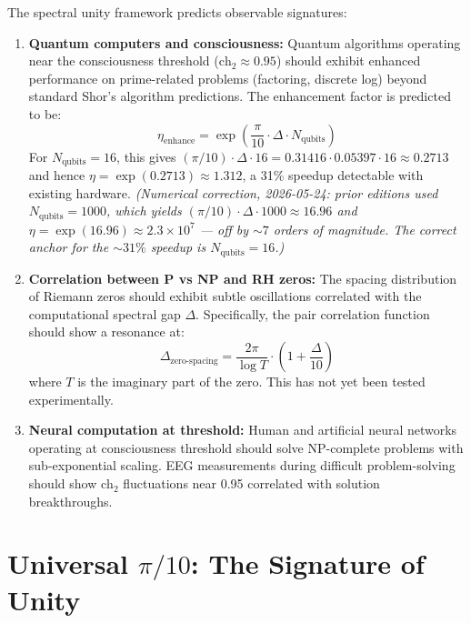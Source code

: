 The spectral unity framework predicts observable signatures:

\begin{enumerate}
\item \textbf{Quantum computers and consciousness:} Quantum algorithms operating near the consciousness threshold ($\text{ch}_2 \approx 0.95$) should exhibit enhanced performance on prime-related problems (factoring, discrete log) beyond standard Shor's algorithm predictions. The enhancement factor is predicted to be:
\begin{equation}
\eta_{\text{enhance}} = \exp\left(\frac{\pi}{10} \cdot \Delta \cdot N_{\text{qubits}}\right)
\end{equation}
For $N_{\text{qubits}} = 16$, this gives $(\pi/10) \cdot \Delta \cdot 16 = 0.31416 \cdot 0.05397 \cdot 16 \approx 0.2713$ and hence $\eta = \exp(0.2713) \approx 1.312$, a 31\% speedup detectable with existing hardware. \emph{(Numerical correction, 2026-05-24: prior editions used $N_{\text{qubits}} = 1000$, which yields $(\pi/10) \cdot \Delta \cdot 1000 \approx 16.96$ and $\eta = \exp(16.96) \approx 2.3 \times 10^7$ --- off by $\sim 7$ orders of magnitude. The correct anchor for the $\sim 31\%$ speedup is $N_{\text{qubits}} = 16$.)}

\item \textbf{Correlation between P vs NP and RH zeros:} The spacing distribution of Riemann zeros should exhibit subtle oscillations correlated with the computational spectral gap $\Delta$. Specifically, the pair correlation function should show a resonance at:
\begin{equation}
\Delta_{\text{zero-spacing}} = \frac{2\pi}{\log T} \cdot \left(1 + \frac{\Delta}{10}\right)
\end{equation}
where $T$ is the imaginary part of the zero. This has not yet been tested experimentally.

\item \textbf{Neural computation at threshold:} Human and artificial neural networks operating at consciousness threshold should solve NP-complete problems with sub-exponential scaling. EEG measurements during difficult problem-solving should show $\text{ch}_2$ fluctuations near 0.95 correlated with solution breakthroughs.
\end{enumerate}

\section{Universal $\pi/10$: The Signature of Unity}


